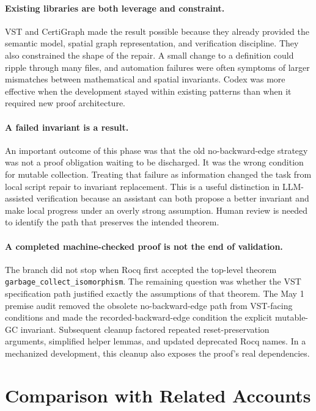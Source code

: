 \documentclass[acmsmall,nonacm]{acmart}
\newcommand{\Rocq}{Rocq}
\newcommand{\CertiGraph}{CertiGraph}
\newcommand{\VST}{VST}
\begin{document}
\paragraph{Existing libraries are both leverage and constraint.}
\VST{} and \CertiGraph{} made the result possible because they already provided
the semantic model, spatial graph representation, and verification discipline.
They also constrained the shape of the repair.  A small change to a definition
could ripple through many files, and automation failures were often symptoms of
larger mismatches between mathematical and spatial invariants.  Codex was more
effective when the development stayed within existing patterns than when it
required new proof architecture.

\paragraph{A failed invariant is a result.}
An important outcome of this phase was that the old
no-backward-edge strategy was not a proof obligation waiting to be discharged.
It was the wrong condition for mutable collection.  Treating that failure as
information changed the task from local script repair to invariant replacement.
This is a useful distinction in LLM-assisted verification because an assistant
can both propose a better invariant and make local progress under an
overly strong assumption.  Human review is needed to identify the path that
preserves the intended theorem.

\paragraph{A completed machine-checked proof is not the end of validation.}
The branch did not stop when \Rocq{} first accepted the top-level theorem
\texttt{garbage\_collect\_isomorphism}.  The remaining question was whether the
\VST{} specification path justified exactly the assumptions of that theorem.
The May 1 premise audit removed the obsolete
no-backward-edge path from \VST{}-facing conditions and made the
recorded-backward-edge condition the explicit mutable-GC invariant.
Subsequent cleanup factored repeated reset-preservation arguments, simplified
helper lemmas, and updated deprecated \Rocq{} names.  In a mechanized
development, this cleanup also exposes the proof's real dependencies.

\section{Comparison with Related Accounts}
\end{document}
